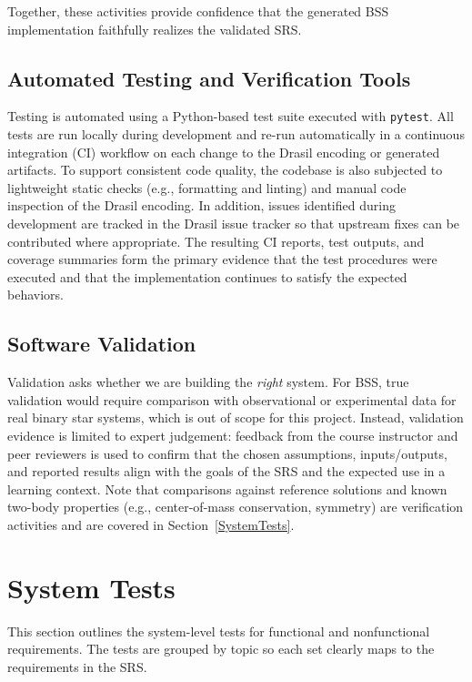 \documentclass[12pt, titlepage]{article}
\begin{document}
Together, these activities provide confidence that the generated BSS
implementation faithfully realizes the validated SRS.
\subsection{Automated Testing and Verification Tools}

Testing is automated using a Python-based test suite executed with \texttt{pytest}.
All tests are run locally during development and re-run automatically in a
continuous integration (CI) workflow on each change to the Drasil encoding or
generated artifacts. To support consistent code quality, the codebase is also
subjected to lightweight static checks (e.g., formatting and linting) and
manual code inspection of the Drasil encoding. In addition, issues identified
during development are tracked in the Drasil issue tracker so that upstream
fixes can be contributed where appropriate. The resulting CI reports, test
outputs, and coverage summaries form the primary evidence that the test
procedures were executed and that the implementation continues to satisfy the
expected behaviors.

\subsection{Software Validation}

Validation asks whether we are building the \emph{right} system. For BSS, true
validation would require comparison with observational or experimental data for
real binary star systems, which is out of scope for this project. Instead,
validation evidence is limited to expert judgement: feedback from the course
instructor and peer reviewers is used to confirm that the chosen assumptions,
inputs/outputs, and reported results align with the goals of the SRS and the
expected use in a learning context. Note that comparisons against reference
solutions and known two-body properties (e.g., center-of-mass conservation,
symmetry) are verification activities and are covered in
Section~\ref{SystemTests}.

\newpage
\section{System Tests}

This section outlines the system-level tests for functional and nonfunctional
requirements. The tests are grouped by topic so each set clearly maps to the
requirements in the SRS.
\end{document}
